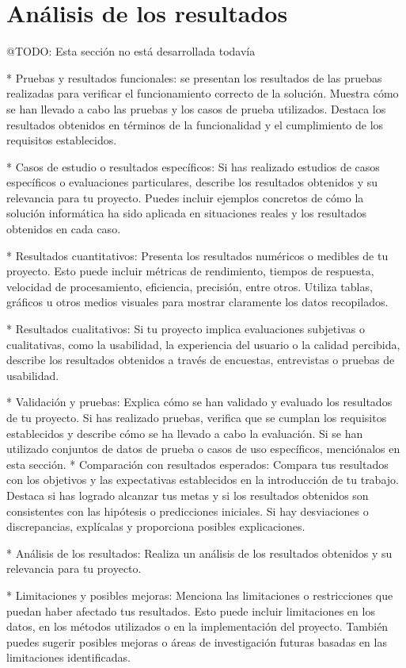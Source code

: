 \section{Análisis de los resultados}

\colorbox{color_highlight}{@TODO: Esta sección no está desarrollada todavía}

* Pruebas y resultados funcionales: se presentan los resultados de las pruebas realizadas para verificar el
funcionamiento correcto de la solución. Muestra cómo se han llevado a cabo las pruebas y los casos de prueba
utilizados. Destaca los resultados obtenidos en términos de la funcionalidad y el cumplimiento de los requisitos
establecidos.

* Casos de estudio o resultados específicos: Si has realizado estudios de casos específicos o evaluaciones particulares,
describe los resultados obtenidos y su relevancia para tu proyecto. Puedes incluir ejemplos concretos de cómo la
solución informática ha sido aplicada en situaciones reales y los resultados obtenidos en cada caso.

* Resultados cuantitativos: Presenta los resultados numéricos o medibles de tu proyecto. Esto puede incluir métricas de
rendimiento, tiempos de respuesta, velocidad de procesamiento, eficiencia, precisión, entre otros. Utiliza tablas,
gráficos u otros medios visuales para mostrar claramente los datos recopilados.

* Resultados cualitativos: Si tu proyecto implica evaluaciones subjetivas o cualitativas, como la usabilidad, la
experiencia del usuario o la calidad percibida, describe los resultados obtenidos a través de encuestas, entrevistas o
pruebas de usabilidad.

* Validación y pruebas: Explica cómo se han validado y evaluado los resultados de tu proyecto. Si has realizado pruebas,
verifica que se cumplan los requisitos establecidos y describe cómo se ha llevado a cabo la evaluación. Si se han
utilizado conjuntos de datos de prueba o casos de uso específicos, menciónalos en esta sección.
* Comparación con resultados esperados: Compara tus resultados con los objetivos y las expectativas establecidos en la
introducción de tu trabajo. Destaca si has logrado alcanzar tus metas y si los resultados obtenidos son consistentes
con las hipótesis o predicciones iniciales. Si hay desviaciones o discrepancias, explícalas y proporciona posibles
explicaciones.

* Análisis de los resultados: Realiza un análisis de los resultados obtenidos y su relevancia para tu proyecto.

* Limitaciones y posibles mejoras: Menciona las limitaciones o restricciones que puedan haber afectado tus resultados.
Esto puede incluir limitaciones en los datos, en los métodos utilizados o en la implementación del proyecto. También
puedes sugerir posibles mejoras o áreas de investigación futuras basadas en las limitaciones identificadas.